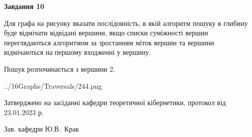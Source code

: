 \documentclass[12pt, ukrainian]{article}
\begin{document}
{\begin {large}
{\begin {center}\textbf{Завдання 10}\end {center}}\par
Для графа на рисунку вказати послідовність, в якій алгоритм пошуку в глибину буде відмічати відвідані вершини, якщо списки суміжності вершин переглядаються алгоритмом за зростанням міток вершин та вершини відмічаються на першому вход\-женні у вершину.\par
Пошук розпочинається з вершини 2.\par

\begin{center}
	{../16Graphs/Traversals/244.png}
\end{center}\par
\newpage


\end {large}
}
{\smallskip \begin {small} Затверджено на засіданні кафедри теоретичної кібернетики, протокол  від   23.01.2023 р.\par\smallskip\smallskip
{\parbox {6.5 cm}{Зав. кафедри \dotfill Ю.В.~Крак}} \end{small}}
\end{document}
